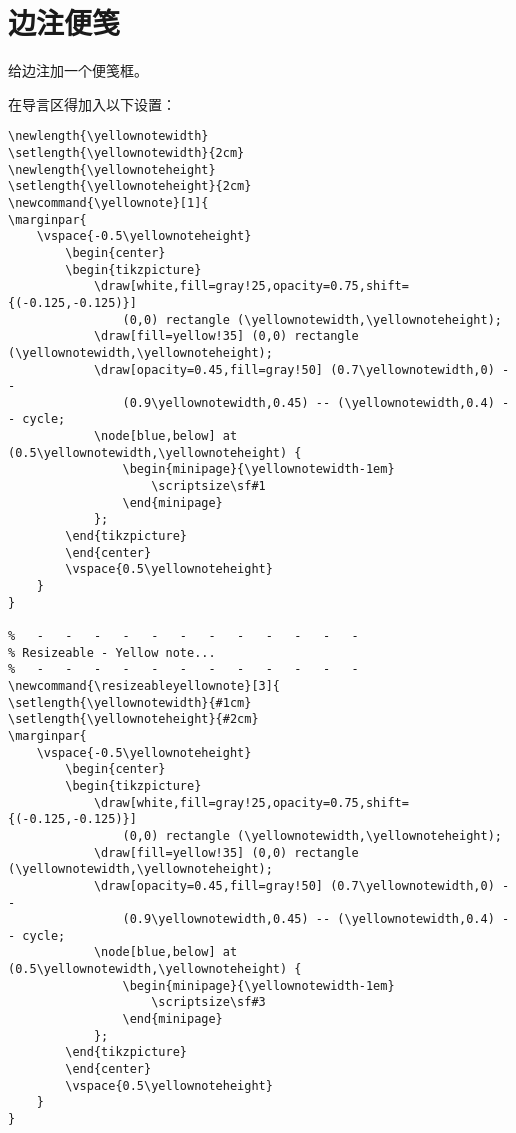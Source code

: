 \section{边注便笺}
给边注加一个便笺框。
\begin{cmd}[label=使用方法]
\end{cmd}
在导言区得加入以下设置：
\footnotesize
\begin{lstlisting}
\newlength{\yellownotewidth}
\setlength{\yellownotewidth}{2cm}
\newlength{\yellownoteheight}
\setlength{\yellownoteheight}{2cm}
\newcommand{\yellownote}[1]{
\marginpar{
    \vspace{-0.5\yellownoteheight}
        \begin{center}
        \begin{tikzpicture}
            \draw[white,fill=gray!25,opacity=0.75,shift={(-0.125,-0.125)}]
                (0,0) rectangle (\yellownotewidth,\yellownoteheight);
            \draw[fill=yellow!35] (0,0) rectangle (\yellownotewidth,\yellownoteheight);
            \draw[opacity=0.45,fill=gray!50] (0.7\yellownotewidth,0) --
                (0.9\yellownotewidth,0.45) -- (\yellownotewidth,0.4) -- cycle;
            \node[blue,below] at (0.5\yellownotewidth,\yellownoteheight) {
                \begin{minipage}{\yellownotewidth-1em}
                    \scriptsize\sf#1
                \end{minipage}
            };
        \end{tikzpicture}
        \end{center}
        \vspace{0.5\yellownoteheight}
    }
}

%   -   -   -   -   -   -   -   -   -   -   -   -
% Resizeable - Yellow note...
%   -   -   -   -   -   -   -   -   -   -   -   -
\newcommand{\resizeableyellownote}[3]{
\setlength{\yellownotewidth}{#1cm}
\setlength{\yellownoteheight}{#2cm}
\marginpar{
    \vspace{-0.5\yellownoteheight}
        \begin{center}
        \begin{tikzpicture}
            \draw[white,fill=gray!25,opacity=0.75,shift={(-0.125,-0.125)}]
                (0,0) rectangle (\yellownotewidth,\yellownoteheight);
            \draw[fill=yellow!35] (0,0) rectangle (\yellownotewidth,\yellownoteheight);
            \draw[opacity=0.45,fill=gray!50] (0.7\yellownotewidth,0) --
                (0.9\yellownotewidth,0.45) -- (\yellownotewidth,0.4) -- cycle;
            \node[blue,below] at (0.5\yellownotewidth,\yellownoteheight) {
                \begin{minipage}{\yellownotewidth-1em}
                    \scriptsize\sf#3
                \end{minipage}
            };
        \end{tikzpicture}
        \end{center}
        \vspace{0.5\yellownoteheight}
    }
}
\end{lstlisting}
